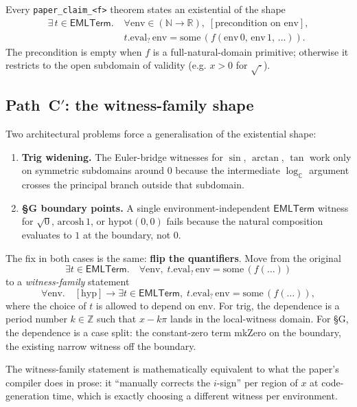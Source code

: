 \documentclass[11pt,a4paper]{article}
\theoremstyle{plain}
\theoremstyle{definition}
\newcommand{\C}{\mathbb{C}}
\newcommand{\R}{\mathbb{R}}
\newcommand{\N}{\mathbb{N}}
\newcommand{\Z}{\mathbb{Z}}
\newcommand{\EMLT}{\mathsf{EMLTerm}}
\begin{document}
Every \texttt{paper\_claim\_<f>} theorem states an existential of the
shape
\begin{align*}
   \exists\,t \in \EMLT.\;
   &\forall \mathrm{env} \in (\N \to \R),
   \;[\text{precondition on } \mathrm{env}], \\
   &t.\mathrm{eval}_?\,\mathrm{env} =
   \mathrm{some}\,(f(\mathrm{env}\,0,\,\mathrm{env}\,1,\,\dots)).
\end{align*}
The precondition is empty when $f$ is a full-natural-domain primitive;
otherwise it restricts to the open subdomain of validity (e.g. $x > 0$
for $\sqrt{\cdot}$).

\subsection{\texorpdfstring{Path~C$'$}{Path C-prime}: the witness-family shape}\label{sec:wf}

Two architectural problems force a generalisation of the existential
shape:

\begin{enumerate}[topsep=2pt, itemsep=2pt]
  \item \textbf{Trig widening.} The Euler-bridge witnesses for $\sin$,
    $\arctan$, $\tan$ work only on symmetric subdomains around $0$
    because the intermediate $\log_\C$ argument crosses the principal
    branch outside that subdomain.
  \item \textbf{§G boundary points.} A single environment-independent
    $\EMLT$ witness for $\sqrt{0}$, $\mathrm{arcosh}\,1$, or
    $\mathrm{hypot}(0, 0)$ fails because the natural composition
    evaluates to $1$ at the boundary, not $0$.
\end{enumerate}

The fix in both cases is the same: \textbf{flip the quantifiers}. Move
from the original
\[
   \exists t \in \EMLT.\quad
   \forall \mathrm{env},\;t.\mathrm{eval}_?\,\mathrm{env} =
   \mathrm{some}\,(f(\dots))
\]
to a \emph{witness-family} statement
\[
   \forall \mathrm{env}.\quad [\mathrm{hyp}] \to
   \exists t \in \EMLT,\;t.\mathrm{eval}_?\,\mathrm{env} =
   \mathrm{some}\,(f(\dots)),
\]
where the choice of $t$ is allowed to depend on $\mathrm{env}$. For
trig, the dependence is a period number $k \in \Z$ such that
$x - k\pi$ lands in the local-witness domain. For §G, the dependence
is a case split: the constant-zero term $\mathrm{mkZero}$ on the
boundary, the existing narrow witness off the boundary.

The witness-family statement is mathematically equivalent to what the
paper's compiler does in prose: it ``manually corrects the $i$-sign''
per region of $x$ at code-generation time, which is exactly choosing a
different witness per environment.
\end{document}
